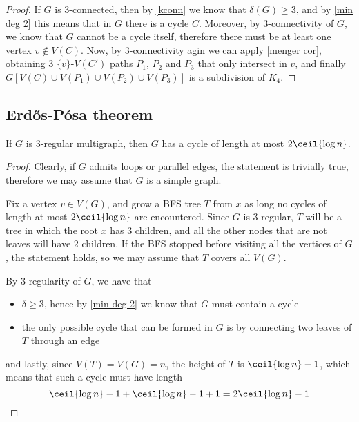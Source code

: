 \documentclass[a4paper, 12pt]{report}
\begin{document}
    \begin{proof}
        If $G$ is 3-connected, then by \cref{kconn} we know that $\delta(G) \ge 3$, and by \cref{min deg 2} this means that in $G$ there is a cycle $C$. Moreover, by 3-connectivity of $G$, we know that $G$ cannot be a cycle itself, therefore there must be at least one vertex $v \notin V(C)$. Now, by 3-connectivity agin we can apply \cref{menger cor}, obtaining 3 $\{v\}$-$V(C')$ paths $P_1$, $P_2$ and $P_3$ that only intersect in $v$, and finally $G[V(C) \cup V(P_1) \cup V(P_2) \cup V(P_3)]$ is a subdivision of $K_4$.
    \end{proof}

    \subsection{Erdős-Pósa theorem}

    \begin{framedprop}{}
        If $G$ is 3-regular multigraph, then $G$ has a cycle of length at most $2 \ceil{\log n}$.
    \end{framedprop}

    \begin{proof}
        Clearly, if $G$ admits loops or parallel edges, the statement is trivially true, therefore we may assume that $G$ is a simple graph.

        Fix a vertex $v \in V(G)$, and grow a BFS tree $T$ from $x$ as long no cycles of length at most $2 \ceil{\log n}$ are encountered. Since $G$ is 3-regular, $T$ will be a tree in which the root $x$ has 3 children, and all the other nodes that are not leaves will have 2 children. If the BFS stopped before visiting all the vertices of $G$, the statement holds, so we may assume that $T$ covers all $V(G)$.

        By 3-regularity of $G$, we have that

        \begin{itemize}
            \item $\delta \ge 3$, hence by \cref{min deg 2} we know that $G$ must contain a cycle
            \item the only possible cycle that can be formed in $G$ is by connecting two leaves of $T$ through an edge
        \end{itemize}

        and lastly, since $V(T) = V(G) = n$, the height of $T$ is $\ceil{\log n} - 1$, which means that such a cycle must have length $$\ceil{\log n} - 1 + \ceil{\log n} - 1 + 1 = 2 \ceil{\log n} - 1$$
    \end{proof}
\end{document}
